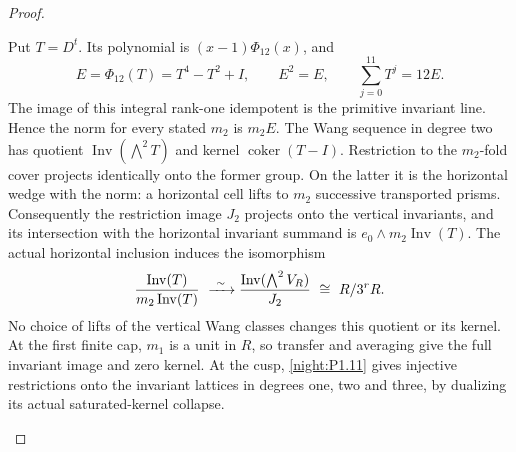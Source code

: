 \documentclass[11pt,a4paper]{article}
\theoremstyle{definition}
\begin{document}
\begin{proof}
\begin{enumerate}[label=\arabic*.]
Put $T=D^t$.  Its polynomial is $(x-1)\Phi_{12}(x)$, and
\[
 E=\Phi_{12}(T)=T^4-T^2+I,\qquad E^2=E,\qquad
 \sum_{j=0}^{11}T^j=12E.
\]
The image of this integral rank-one idempotent is the primitive
invariant line.  Hence the norm for every stated $m_2$ is $m_2E$.
The Wang sequence in degree two has quotient
$\operatorname{Inv}(\bigwedge^2T)$ and kernel
$\operatorname{coker}(T-I)$.  Restriction to the $m_2$-fold cover
projects identically onto the former group.  On the latter it is
the horizontal wedge with the norm: a horizontal cell lifts to
$m_2$ successive transported prisms.
Consequently the restriction image $J_2$ projects onto the vertical
invariants, and its intersection with the horizontal invariant
summand is $e_0\wedge m_2\operatorname{Inv}(T)$.
The actual horizontal inclusion induces the isomorphism
\[
 \frac{\operatorname{Inv}(T)}{m_2\operatorname{Inv}(T)}
 \ \xrightarrow{\ \sim\ }\\
 \frac{\operatorname{Inv}(\bigwedge^2V_R)}{J_2}
 \ \cong\ R/3^rR.
\]
No choice of lifts of the vertical Wang classes changes this
quotient or its kernel.  At the first finite cap, $m_1$ is a unit
in $R$, so transfer and averaging give the full invariant image
and zero kernel.  At the cusp, \cref{night:P1.11} gives injective
restrictions onto the invariant lattices in degrees one, two
and three, by dualizing its actual saturated-kernel collapse.


\end{enumerate}
\end{proof}
\end{document}
